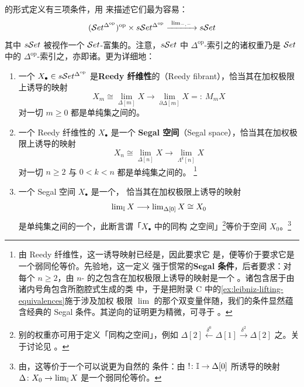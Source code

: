 \trCompleteSegalSpaces{}的形式定义有三项条件，用\trWeightedLimit{}%
\trBifunctor{}来描述它们最为容易：
\[
(\mathcal{S}et^{\Delta^{\mathrm{op}}})^{\mathrm{op}}\times s\mathcal{S}et^{\Delta^{\mathrm{op}}}
\xrightarrow{\ \operatorname{lim}_{-,-}\ }s\mathcal{S}et
\]
其中 $s\mathcal{S}et$ 被视作一个 $\mathcal{S}et$-富集的\trCategory。注意，$s\mathcal{S}et$ 中
$\Delta^{\mathrm{op}}$-索引之\trDiagram{}的诸权重乃是 $\mathcal{S}et$ 中的
$\Delta^{\mathrm{op}}$-索引之\trDiagram，亦即诸\trSimplicialSet。更为详细地：

\begin{definition}[完全 Segal 空间]\label{def:complete-segal-space}
\begin{enumerate}[label=(\roman*)]
\item 一个\trSimplicialObject{} $X_{\bullet}\in s\mathcal{S}et^{\Delta^{\mathrm{op}}}$
  是\textbf{Reedy 纤维性}的（Reedy fibrant），恰当其在加权极限上诱导的映射
  \[
  X_{m}\cong\operatorname{lim}_{\Delta[m]}X\longrightarrow
  \operatorname{lim}_{\partial\Delta[m]}X=:\ M_{m}X
  \]
  对一切 $m\ge 0$ 都是单纯集之间的\trKanFibration。
\item 一个 Reedy 纤维性的\trSimplicialObject{} $X_{\bullet}$ 是一个%
  \textbf{Segal 空间}（Segal space），恰当其在加权极限上诱导的映射
  \[
  X_{n}\cong\operatorname{lim}_{\Delta[n]}X\longrightarrow
  \operatorname{lim}_{\Lambda^{k}[n]}X
  \]
  对一切 $n\ge 2$ 与 $0<k<n$ 都是单纯集之间的\trTrivialFibration。%
  \footnote{由 Reedy 纤维性，这一诱导映射已经是\trKanFibration，因此要求它
  是\trTrivialFibration，便等价于要求它是一个弱同伦等价。先验地，这一定义
  强于惯常的\textbf{Segal 条件}，后者要求：对每个 $n\ge 2$，由 $n$-%
  \trSimplex{}的\trSpine{}之包含在加权极限上诱导的映射是一个%
  \trTrivialFibration。诸\trSpine{}包含居于由诸内号角包含所胞腔式生成的类
  中，于是把附录 C 中的\cref{ex:leibniz-lifting-equivalences}施于涉及加权
  极限 $\operatorname{lim}$ 的那个双变量伴随，我们的条件显然蕴含经典的
  Segal 条件。其逆向的证明更为精微，可寻于 \cite[3.4]{bib64}。}
\item 一个 Segal 空间 $X_{\bullet}$ 是一个\textbf{\trCompleteSegalSpaces}，
  恰当其在加权极限上诱导的映射
  \[
  \operatorname{lim}_{\mathbb{I}}X\longrightarrow
  \operatorname{lim}_{\Delta[0]}X\cong X_{0}
  \]
  是单纯集之间的一个\trTrivialFibration，此断言谓「$X_{\bullet}$ 中的同构
  之空间」\footnote{别的权重亦可用于定义「同构之空间」，例如%
  $\Delta[2]\xleftarrow{\ \delta^{0}\ }\Delta[1]\xrightarrow{\ \delta^{2}\ }\Delta[2]$ 之\trPushout。关于讨论见 \cite[\S11]{bib100}。}等价于空间
  $X_{0}$。\footnote{由\trTwoOfThreeProperty，这等价于一个可以说更为自然的
  条件：由 $!\colon\mathbb{I}\to\Delta[0]$ 所诱导的映射
  $\Delta\colon X_{0}\to\operatorname{lim}_{\mathbb{I}}X$ 是一个弱同伦等价。}
\end{enumerate}
\end{definition}

